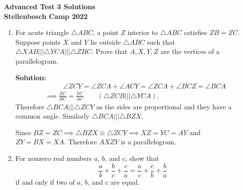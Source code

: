 \documentclass[12pt]{article}
\begin{document}
\thispagestyle{empty}

\begin{center} \bfseries
  \Large Advanced Test 3 Solutions
  \\ \vspace{12pt}
  \large Stellenbosch Camp 2022
\end{center}

\bigskip \bigskip

\begin{enumerate}[itemsep=24pt]

\item 
For acute triangle $\triangle ABC$, a point $Z$ interior to $\triangle ABC$ satisfies $ZB = ZC$.
Suppose points $X$ and $Y$ lie outside $\triangle ABC$ such that $\triangle XAB \mathrel{|||} \triangle YCA \mathrel{|||} \triangle ZBC$.
Prove that $A,X,Y,Z$ are the vertices of a parallelogram. 

\textbf{Solution:}
\begin{align*}
  &\mspace{48mu} \angle ZCY = \angle ZCA + \angle ACY = \angle ZCA + \angle BCZ = \angle BCA \\
  &\implies \frac{ZC}{BC} = \frac{YC}{AC} \qquad (\triangle ZCB \mathrel{|||} \triangle YCA).
\end{align*}
Therefore $\triangle BCA \mathrel{|||} \triangle ZCY$ as the sides are proportional and they have a common angle. Similarly $\triangle BCA \mathrel{|||} \triangle BZX$. 

Since $BZ = ZC \implies \triangle BZX \equiv \triangle ZCY \implies XZ = YC = AY$ and $ZY = BX = XA$.
Therefore $AXZY$ is a parallelogram.


\item %
For nonzero real numbers $a$, $b$, and $c$, show that
\[ \frac{a}{b} +\frac{b}{c} +\frac{c}{a} = \frac{a}{c} +\frac{c}{b} +\frac{b}{a} \]
if and only if two of $a$, $b$, and $c$ are equal.


\end{enumerate}
\end{document}
